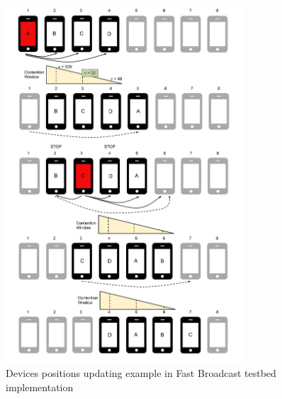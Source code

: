 \begin{figure}[htbp]
\centering
\includegraphics[trim = 10mm 15mm 10mm 10mm ,width=3.5in]{imgs/Positions_1.pdf}
\caption{Devices positions updating example in Fast Broadcast testbed implementation}
\label{fig:positions}
\end{figure}
